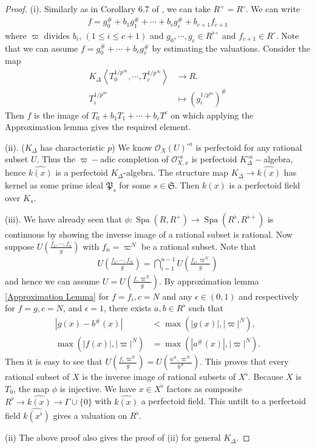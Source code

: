 \documentclass[12pts,a4paper]{amsart}
\DeclareMathOperator{\spa}{Spa}
\begin{document}
\begin{proof}
    (i). Similarly as in Corollary 6.7 of \cite{Sch}, we can take $R^+=R^\circ$. We can write 
    \begin{align*}
        f=g^\#_0+b_1g^\#_1+\cdots+b_cg^\#_c+b_{c+1}f_{c+1}
    \end{align*}
    where $\varpi$ divides $b_i$, $(1\leq i\leq c+1)$ and $g_0,\cdots,g_c\in R^{\flat\circ}$ and $f_{c+1}\in R^\circ$. Note that we can assume $f=g^\#_0+\cdots+b_cg^\#_c$ by estimating the valuations. Consider the map
    \begin{align*}
        K_\Delta\left<T^{1/p^\infty}_0,\cdots,T^{1/p^\infty}_c\right>&\to R .\\
                                                        T_i^{1/p^m}  &\mapsto (g^{1/p^m}_i)^\#
    \end{align*}
    Then $f$ is the image of $T_0+b_1T_1+\cdots+b_cT^c$ on which applying the Approximation lemma gives the required element.

    (ii). ($K_\Delta$ has characteristic $p$) We know $\mathcal{O}_X(U)^{\circ a}$ is perfectoid for any rational subset $U$. Thus the $\varpi-$adic completion of $\mathcal{O}^{\circ a}_{X,x}$ is perfectoid $K^{\circ a}_\Delta-$algebra, hence $\widehat{k(x)}$ is a perfectoid $K_\Delta$-algebra. The structure map $K_\Delta\to \widehat{k(x)}$ has kernel as some prime ideal $\mathfrak{P}_s$ for some $s\in\mathfrak{S}$. Then $\widehat{k(x)}$ is a perfectoid field over $K_s$.

    (iii). We have already seen that $\phi:\spa(R,R^+)\to \spa(R^\flat,R^{\flat +})$ is continuous by showing the inverse image of a rational subset is rational. Now suppose $U\left(\frac{f_1,\cdots,f_n}{g}\right)$ with $f_n=\varpi^N$ be a rational subset. Note that 
    \begin{align*}
        U\left(\frac{f_1,\cdots,f_N}{g}\right)=\bigcap\limits_{i=1}^{n-1}U\left(\frac{f_i,\varpi^N}{g}\right)
    \end{align*}
    and hence we can assume $U=U\left(\frac{f,\varpi^N}{g}\right)$. By approximation lemma \ref{Approximation Lemma} for $f=f_i,c=N$ and any $\epsilon\in (0,1)$ and respectively for $f=g,c=N$, and $\epsilon=1$, there exists $a,b\in R^\flat$ such that
    \begin{align*}
        |g(x)-b^\#(x)|&<\max(|g(x)|,|\varpi|^N) ,\\
        \max(|f(x)|,|\varpi|^N)&=\max(|a^\#(x)|,|\varpi|^N).
    \end{align*}
    Then it is easy to see that $U\left(\frac{f,\varpi^N}{g}\right)=U\left(\frac{a^\#,\varpi^N}{b^\#}\right)$. This proves that every rational subset of $X$ is the inverse image of rational subsets of $X^\flat$. Because $X$ is $T_0$, the map $\phi$ is injective. We have $x\in X^\flat$ factors as composite $R^\flat\to \hat{k(x)}\to \Gamma\cup \{0\}$ with $\hat{k(x)}$ a perfectoid field. This untilt to a perfectoid field $\widehat{k(x^\flat)}$ gives a valuation on $R^\flat$.

    (ii) The above proof also gives the proof of (ii) for general $K_\Delta$.
\end{proof}
\end{document}
